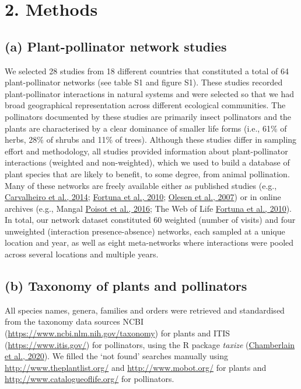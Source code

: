 \documentclass[
  12pt,
  a4paper,
]{article}
\begin{document}
\hypertarget{methods}{%
\section{2. Methods}\label{methods}}

\hypertarget{a-plant-pollinator-network-studies}{%
\subsection{(a) Plant-pollinator network studies}\label{a-plant-pollinator-network-studies}}

We selected 28 studies from 18 different countries that constituted a total of 64 plant-pollinator networks (see table S1 and figure S1). These studies recorded plant-pollinator interactions in natural systems and were selected so that we had broad geographical representation across different ecological communities. The pollinators documented by these studies are primarily insect pollinators and the plants are characterised by a clear dominance of smaller life forms (i.e., 61\% of herbs, 28\% of shrubs and 11\% of trees). Although these studies differ in sampling effort and methodology, all studies provided information about plant-pollinator interactions (weighted and non-weighted), which we used to build a database of plant species that are likely to benefit, to some degree, from animal pollination. Many of these networks are freely available either as published studies (e.g., \protect\hyperlink{ref-carvalheiro2014}{Carvalheiro et al., 2014}; \protect\hyperlink{ref-fortuna2010}{Fortuna et al., 2010}; \protect\hyperlink{ref-olesen2007}{Olesen et al., 2007}) or in online archives (e.g., Mangal \protect\hyperlink{ref-poisot2016}{Poisot et al., 2016}; The Web of Life \protect\hyperlink{ref-fortuna2010}{Fortuna et al., 2010}). In total, our network dataset constituted 60 weighted (number of visits) and four unweighted (interaction presence-absence) networks, each sampled at a unique location and year, as well as eight meta-networks where interactions were pooled across several locations and multiple years.

\hypertarget{b-taxonomy-of-plants-and-pollinators}{%
\subsection{(b) Taxonomy of plants and pollinators}\label{b-taxonomy-of-plants-and-pollinators}}

All species names, genera, families and orders were retrieved and standardised from the taxonomy data sources NCBI (\url{https://www.ncbi.nlm.nih.gov/taxonomy}) for plants and ITIS (\url{https://www.itis.gov/}) for pollinators, using the R package \emph{taxize} (\protect\hyperlink{ref-chamberlain2020}{Chamberlain et al., 2020}). We filled the `not found' searches manually using \url{http://www.theplantlist.org/} and \url{http://www.mobot.org/} for plants and \url{http://www.catalogueoflife.org/} for pollinators.
\end{document}

